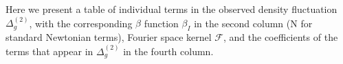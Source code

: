 
Here we present a table of individual terms in the observed density fluctuation $\Delta_g^{(2)}$, with the corresponding $\beta$ function $\beta_I$ in the second column (N for standard Newtonian terms), Fourier space kernel $\mathcal{F}$, and the coefficients of the terms that appear in $\Delta_g^{(2)}$ in the fourth column. 

